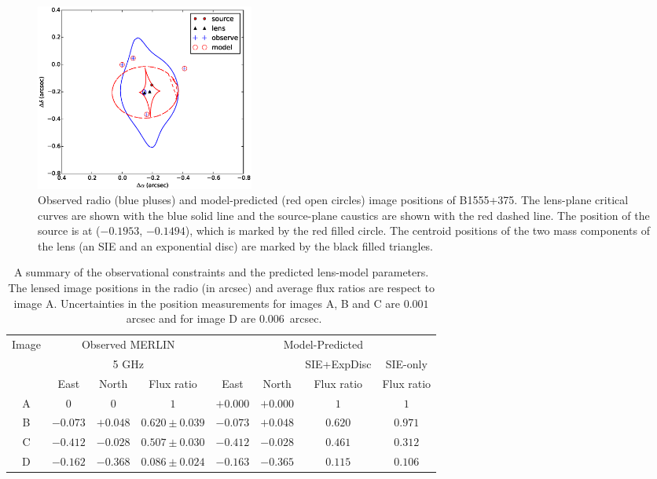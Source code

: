 \documentclass[a4paper,fleqn,usenatbib,useAMS]{mnras}
\begin{document}
\begin{figure}
\includegraphics[width=72mm]{gravlens_exp_try5_plot.eps}
\caption{Observed radio (blue pluses) and model-predicted (red open circles) image positions of B1555+375. The lens-plane critical curves are shown with the blue solid line and the source-plane caustics are shown with the red dashed line. The position of the source is at ($-0.1953$, $-0.1494$), which is marked by the red filled circle. The centroid positions of the two mass components of the lens (an SIE and an exponential disc) are marked by the black filled triangles.}
\label{fig:model}
\end{figure}

\begin{table}
\centering
\caption{A summary of the observational constraints and the predicted lens-model parameters. The lensed image positions in the radio \citep{Marlow99} (in arcsec) and average flux ratios \citep{K03} are respect to image A. Uncertainties in the position measurements for images A, B and C are $0.001$~arcsec and for image D are $0.006$~arcsec.}
\begin{tabular}{cccccccc}
\hline
Image	&\multicolumn{3}{c}{Observed MERLIN} 	 	& \multicolumn{4}{c}{Model-Predicted}\\
		&\multicolumn{3}{c}{5 GHz}		& & & {SIE+ExpDisc} & SIE-only\\
		&East &North & Flux ratio &East 	&North & Flux ratio &Flux ratio\\ 
\hline
A  &$0$    		&$0$			&  $1$ 				&$+0.000$  &$+0.000$	& $1$ 		& $1$\\  
B  &$-0.073$	&$+0.048$	& $0.620 \pm 0.039$ 	&$-0.073$ &$+0.048$		& $0.620$ 	& $0.971$ \\  
C  &$-0.412$ 	&$-0.028$	& $0.507\pm 0.030$	&$-0.412$ &$-0.028$		& $0.461$ 	& $0.312$\\  
D  &$-0.162$	&$-0.368$	& $0.086 \pm 0.024$ 	&$-0.163$ &$-0.365$		& $0.115$ 	& $0.106$\\  
\hline
\end{tabular}
\label{tab:results}
\end{table}
\end{document}
